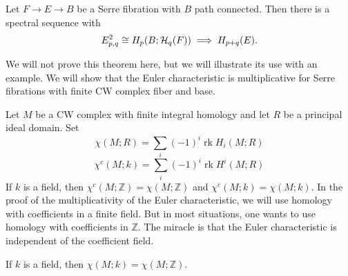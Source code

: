\documentclass[12pt]{article}
\begin{document}
\begin{theorem}
Let $F \to E \to B$ be a Serre fibration with $B
$ path connected. Then there is a spectral sequence with
\[E^2_{p,q} \cong H_p(B; {\mathcal{H}}_q(F)) \implies H_{p+q}(E).\]
\end{theorem}

We will not prove this theorem here, but we will illustrate its use with an example. We will show that the Euler characteristic is multiplicative for Serre fibrations with finite CW complex fiber and base.




Let $M$ be a CW complex with finite integral homology and let $R$ be a principal ideal domain.
Set \[\chi(M;R) = \sum_i (-1)^i \operatorname{rk} H_i(M;R)\]
\[\chi^c(M;k) = \sum_i (-1)^i \operatorname{rk} H^i(M;R)\] If $k$ is a field, then $\chi^c(M;\mathbb{Z}) = \chi(M;\mathbb{Z})$ and $\chi^c(M;k) = \chi(M;k)$. In the proof of the multiplicativity of the Euler characteristic, we will use homology with coefficients in a finite field. But in most situations, one wants to use homology with coefficients in $\mathbb{Z}$. The miracle is that the Euler characteristic is independent of the coefficient field.

\begin{proposition}
    If $k$ is a field, then $\chi(M;k) = \chi(M;\mathbb{Z})$.
\end{proposition}
\end{document}
